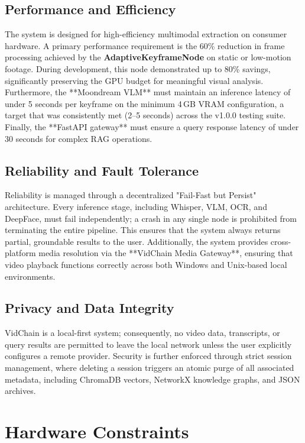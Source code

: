 \subsection{Performance and Efficiency}
The system is designed for high-efficiency multimodal extraction on consumer hardware. A primary performance requirement is the 60\% reduction in frame processing achieved by the \textbf{AdaptiveKeyframeNode} on static or low-motion footage. During development, this node demonstrated up to 80\% savings, significantly preserving the GPU budget for meaningful visual analysis. Furthermore, the **Moondream VLM** must maintain an inference latency of under 5 seconds per keyframe on the minimum 4\,GB VRAM configuration, a target that was consistently met (2--5 seconds) across the v1.0.0 testing suite. Finally, the **FastAPI gateway** must ensure a query response latency of under 30 seconds for complex RAG operations.

\subsection{Reliability and Fault Tolerance}
Reliability is managed through a decentralized "Fail-Fast but Persist" architecture. Every inference stage, including Whisper, VLM, OCR, and DeepFace, must fail independently; a crash in any single node is prohibited from terminating the entire pipeline. This ensures that the system always returns partial, groundable results to the user. Additionally, the system provides cross-platform media resolution via the **VidChain Media Gateway**, ensuring that video playback functions correctly across both Windows and Unix-based local environments.

\subsection{Privacy and Data Integrity}
VidChain is a local-first system; consequently, no video data, transcripts, or query results are permitted to leave the local network unless the user explicitly configures a remote provider. Security is further enforced through strict session management, where deleting a session triggers an atomic purge of all associated metadata, including ChromaDB vectors, NetworkX knowledge graphs, and JSON archives.

\section{Hardware Constraints}

